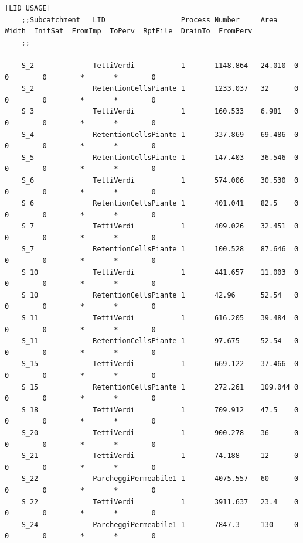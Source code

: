 \begin{landscape}
\begin{lstlisting}[basicstyle=\scriptsize\ttfamily,numberstyle=\tiny]
    [LID_USAGE]
    ;;Subcatchment   LID                  Process Number     Area    Width  InitSat  FromImp  ToPerv  RptFile  DrainTo  FromPerv
    ;;-------------- ----------------     ------- ---------  ------  -----  -------  -------  ------  -------- --------
    S_2              TettiVerdi           1       1148.864   24.010  0      0        0        *       *        0
    S_2              RetentionCellsPiante 1       1233.037   32      0      0        0        *       *        0
    S_3              TettiVerdi           1       160.533    6.981   0      0        0        *       *        0
    S_4              RetentionCellsPiante 1       337.869    69.486  0      0        0        *       *        0
    S_5              RetentionCellsPiante 1       147.403    36.546  0      0        0        *       *        0
    S_6              TettiVerdi           1       574.006    30.530  0      0        0        *       *        0
    S_6              RetentionCellsPiante 1       401.041    82.5    0      0        0        *       *        0
    S_7              TettiVerdi           1       409.026    32.451  0      0        0        *       *        0
    S_7              RetentionCellsPiante 1       100.528    87.646  0      0        0        *       *        0
    S_10             TettiVerdi           1       441.657    11.003  0      0        0        *       *        0
    S_10             RetentionCellsPiante 1       42.96      52.54   0      0        0        *       *        0
    S_11             TettiVerdi           1       616.205    39.484  0      0        0        *       *        0
    S_11             RetentionCellsPiante 1       97.675     52.54   0      0        0        *       *        0
    S_15             TettiVerdi           1       669.122    37.466  0      0        0        *       *        0
    S_15             RetentionCellsPiante 1       272.261    109.044 0      0        0        *       *        0
    S_18             TettiVerdi           1       709.912    47.5    0      0        0        *       *        0
    S_20             TettiVerdi           1       900.278    36      0      0        0        *       *        0
    S_21             TettiVerdi           1       74.188     12      0      0        0        *       *        0
    S_22             ParcheggiPermeabile1 1       4075.557   60      0      0        0        *       *        0
    S_22             TettiVerdi           1       3911.637   23.4    0      0        0        *       *        0
    S_24             ParcheggiPermeabile1 1       7847.3     130     0      0        0        *       *        0
\end{lstlisting}
\end{landscape}
